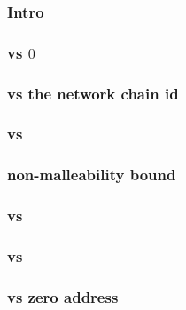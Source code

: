 \subsubsection{Intro}                                     \label{rlp auth: comparisons: validity: intro}                             
\subsubsection{\locChainId{} vs $0$}                      \label{rlp auth: comparisons: validity: chain id iszero}                   
\subsubsection{\locChainId{} vs the network chain id}     \label{rlp auth: comparisons: validity: chain id vs network chain id}      
\subsubsection{\locNonce{} vs \maxNonce{}}                \label{rlp auth: comparisons: validity: nonce EIP 2681 bound}              
\subsubsection{\locSignatureS{} non-malleability bound}   \label{rlp auth: comparisons: validity: signature s non malleabiliity}     
\subsubsection{\locNonce{} vs \locAccountNonce{}}         \label{rlp auth: comparisons: validity: nonce vs account nonce}            
\subsubsection{\locAuthority{} vs \locFrom{}}             \label{rlp auth: comparisons: validity: authority vs sender address}       
\subsubsection{\locAuthority{} vs zero address}           \label{rlp auth: comparisons: validity: authority vs zero address}         
